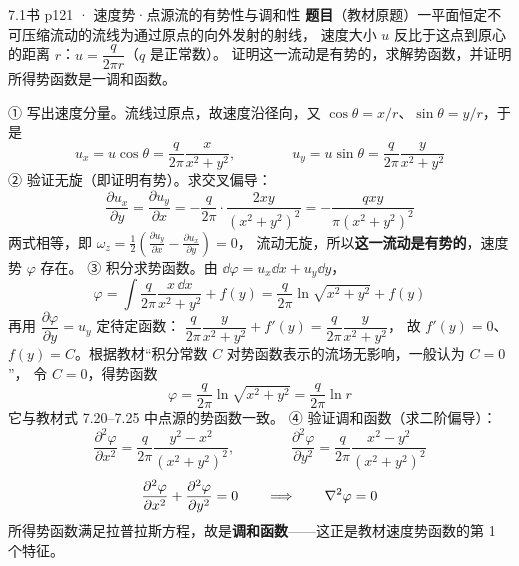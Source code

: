 \begin{liti}{7.1}{书 p121 · 速度势·点源流的有势性与调和性}
\textbf{题目}（教材原题）一平面恒定不可压缩流动的流线为通过原点的向外发射的射线，
速度大小 $u$ 反比于这点到原心的距离 $r$：$u=\dfrac{q}{2\pi r}$（$q$ 是正常数）。
证明这一流动是有势的，求解势函数，并证明所得势函数是一调和函数。
\begin{jie}
① 写出速度分量。流线过原点，故速度沿径向，又 $\cos\theta=x/r$、$\sin\theta=y/r$，于是
\[ u_x=u\cos\theta=\frac{q}{2\pi}\frac{x}{x^2+y^2},\qquad\qquad
   u_y=u\sin\theta=\frac{q}{2\pi}\frac{y}{x^2+y^2} \]
② 验证无旋（即证明有势）。求交叉偏导：
\[ \frac{\partial u_x}{\partial y}=\frac{\partial u_y}{\partial x}
   =-\frac{q}{2\pi}\cdot\frac{2xy}{\left(x^2+y^2\right)^2}
   =-\frac{qxy}{\pi\left(x^2+y^2\right)^2} \]
两式相等，即 $\omega_z=\frac12\left(\frac{\partial u_y}{\partial x}-\frac{\partial u_x}{\partial y}\right)=0$，
流动无旋，所以\textbf{这一流动是有势的}，速度势 $\varphi$ 存在。
③ 积分求势函数。由 $\dd\varphi=u_x\dd x+u_y\dd y$，
\[ \varphi=\int\frac{q}{2\pi}\frac{x\,\dd x}{x^2+y^2}+f(y)
   =\frac{q}{2\pi}\ln\sqrt{x^2+y^2}+f(y) \]
再用 $\dfrac{\partial\varphi}{\partial y}=u_y$ 定待定函数：
$\dfrac{q}{2\pi}\dfrac{y}{x^2+y^2}+f'(y)=\dfrac{q}{2\pi}\dfrac{y}{x^2+y^2}$，
故 $f'(y)=0$、$f(y)=C$。根据教材“积分常数 $C$ 对势函数表示的流场无影响，一般认为 $C=0$”，
令 $C=0$，得势函数
\[ \varphi=\frac{q}{2\pi}\ln\sqrt{x^2+y^2}=\frac{q}{2\pi}\ln r \]
它与教材式 7.20--7.25 中点源的势函数一致。
④ 验证调和函数（求二阶偏导）：
\[ \frac{\partial^2\varphi}{\partial x^2}=\frac{q}{2\pi}\frac{y^2-x^2}{\left(x^2+y^2\right)^2},
   \qquad\qquad
   \frac{\partial^2\varphi}{\partial y^2}=\frac{q}{2\pi}\frac{x^2-y^2}{\left(x^2+y^2\right)^2} \]
\[ \frac{\partial^2\varphi}{\partial x^2}+\frac{\partial^2\varphi}{\partial y^2}=0
   \qquad\Longrightarrow\qquad \nabla^2\varphi=0 \]
所得势函数满足拉普拉斯方程，故是\textbf{调和函数}——这正是教材速度势函数的第 1 个特征。
\end{jie}
\end{liti}

